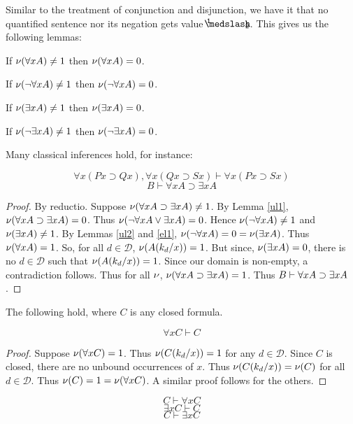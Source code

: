 \noindent Similar to the treatment of conjunction and disjunction, we have it that no quantified sentence nor its negation gets value $\oneHalf$. This gives us the following lemmas:
\vspace*{-12pt}
\begin{singlespace}
	\begin{lem}\label{ul1}
	If $\mathcal{\nu}({\forall xA})\neq 1$ then $\mathcal{\nu}(\forall xA)=0$.
	\end{lem}
	\begin{lem}\label{ul2}
	If $\mathcal{\nu}({\neg\forall xA})\neq 1$ then $\mathcal{\nu}(\neg\forall xA)=0$.
	\end{lem}
	\begin{lem}\label{el1}
	If $\mathcal{\nu}({\exists xA})\neq 1$ then $\mathcal{\nu}(\exists xA)=0$.
	\end{lem}
	\begin{lem}\label{el2}
	If $\mathcal{\nu}({\neg\exists xA})\neq 1$ then $\mathcal{\nu}(\neg\exists xA)=0$.
	\end{lem}
\end{singlespace}

\noindent Many classical inferences hold, for instance:

\[\forall x(Px\supset Qx), \forall x(Qx\supset Sx)\vdash\forall x(Px\supset Sx)\]
\[B\vdash\forall xA\supset\exists xA\]

\begin{singlespace}
\begin{proof}
By reductio. Suppose $\mathcal{\nu}({\forall xA\supset\exists x A})\neq 1$. By Lemma \ref{ul1}, $\mathcal{\nu}(\forall xA\supset\exists x A)=0$. Thus $\mathcal{\nu}(\neg\forall xA\vee\exists xA)=0$. Hence $\mathcal{\nu}({\neg\forall xA})\neq 1$ and $\mathcal{\nu}({\exists xA})\neq 1$. By Lemmas \ref{ul2} and \ref{el1}, $\mathcal{\nu}(\neg\forall xA)=0=\mathcal{\nu}(\exists xA)$. Thus $\mathcal{\nu}({\forall xA})=1$. So, for all $d\in\mathcal{D}$, $\mathcal{\nu}({A(k_d/x)})=1$. But since, $\mathcal{\nu}(\exists xA)=0$, there is no $d\in\mathcal{D}$ such that $\mathcal{\nu}({A(k_d/x)})=1$. Since our domain is non-empty, a contradiction follows. Thus for all $\mathcal{\nu}$, $\mathcal{\nu}({\forall xA\supset\exists x A})=1$. Thus ${B}\vdash{\forall xA\supset\exists xA}$.
\end{proof}
\end{singlespace}
\noindent The following hold, where $C$ is any closed formula.

\begin{singlespace}
\[\forall xC\vdash C\]
\begin{proof}
Suppose $\mathcal{\nu}(\forall xC)=1$. Thus $\mathcal{\nu}(C(k_d/x))=1$ for any $d\in\mathcal{D}$. Since $C$ is closed, there are no unbound occurrences of $x$. Thus $\mathcal{\nu}(C(k_d/x))=\mathcal{\nu}(C)$ for all $d\in\mathcal{D}$. Thus $\mathcal{\nu}(C)=1=\mathcal{\nu}(\forall xC)$. A similar proof follows for the others.
\end{proof}
\[C\vdash\forall xC\]
\[\exists xC\vdash C\]
\[C\vdash\exists xC\]
\end{singlespace}

